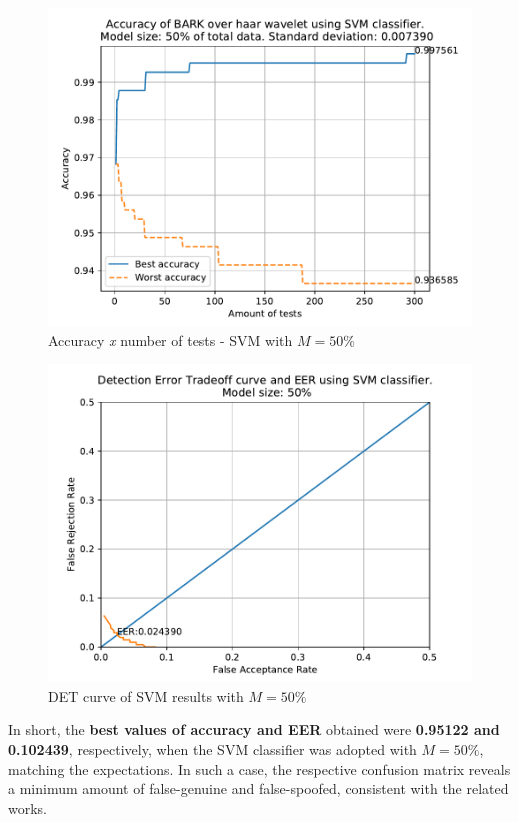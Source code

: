 	\begin{figure}[H]
		\centering
		\includegraphics[scale=.8]{images/results/confusionMatrices/classifier_SVM_50.pdf}
		\caption{Accuracy \textit{x} number of tests - SVM with $M=50\%$}
		\label{fig:classifiersvm50}
	\end{figure}
	\begin{figure}[H]
		\centering
		\includegraphics[scale=.8]{images/results/det/DET_for_classifier_SVM_50.pdf}
		\caption{DET curve of SVM results with $M=50\%$}
		\label{fig:detsvm50}
	\end{figure}

	\par In short, the \textbf{best values of accuracy and EER} obtained were \textbf{0.95122 and 0.102439}, respectively, when the SVM classifier was adopted with $M=50\%$, matching the expectations. In such a case, the respective confusion matrix reveals a minimum amount of false-genuine and false-spoofed, consistent with the related works.
	\\
	
